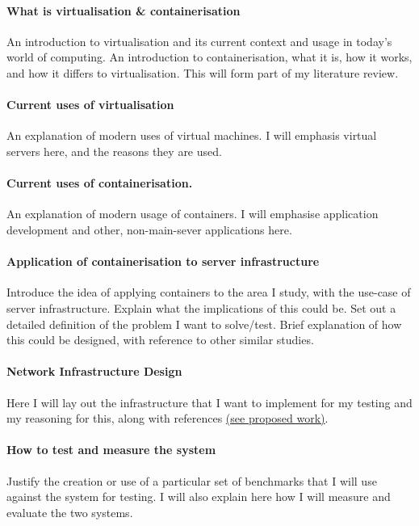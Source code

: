 \paragraph{What is virtualisation \& containerisation} An introduction to virtualisation and its current context and usage in today's world of computing. An introduction to containerisation, what it is, how it works, and how it differs to virtualisation. This will form part of my literature review.

\paragraph{Current uses of virtualisation} An explanation of modern uses of virtual machines. I will emphasis virtual servers here, and the reasons they are used.

\paragraph{Current uses of containerisation.} An explanation of modern usage of containers. I will emphasise application development and other, non-main-sever applications here.

\paragraph{Application of containerisation to server infrastructure} Introduce the idea of applying containers to the area I study, with the use-case of server infrastructure. Explain what the implications of this could be. Set out a detailed definition of the problem I want to solve/test. Brief explanation of how this could be designed, with reference to other similar studies.

\paragraph{Network Infrastructure Design} Here I will lay out the infrastructure that I want to implement for my testing and my reasoning for this, along with references \hyperref[proposed]{(see proposed work)}.

\paragraph{How to test and measure the system} Justify the creation or use of a particular set of benchmarks that I will use against the system for testing. I will also explain here how I will measure and evaluate the two systems.


